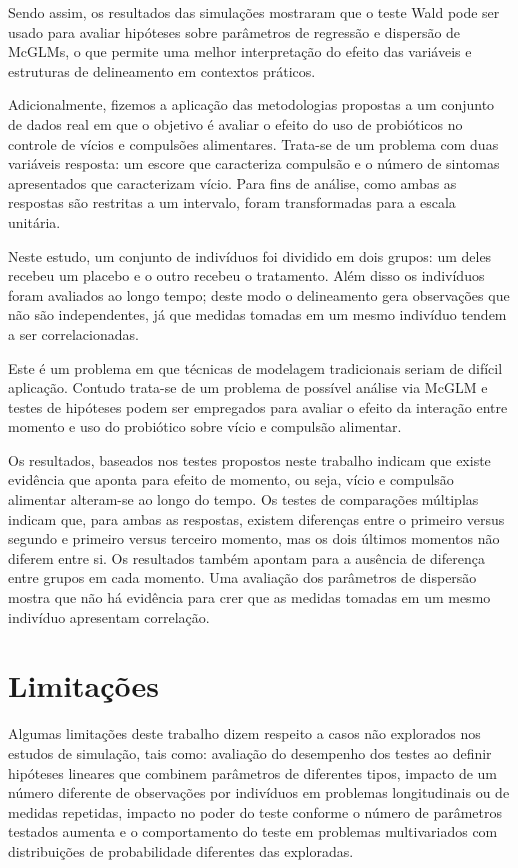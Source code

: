 Sendo assim, os resultados das simulações mostraram que o teste Wald pode ser usado para avaliar hipóteses sobre parâmetros de regressão e dispersão de McGLMs, o que permite uma melhor interpretação do efeito das variáveis e estruturas de delineamento em contextos práticos.

Adicionalmente, fizemos a aplicação das metodologias propostas a um conjunto de dados real em que o objetivo é avaliar o efeito do uso de probióticos no controle de vícios e compulsões alimentares. Trata-se de um problema com duas variáveis resposta: um escore que caracteriza compulsão e o número de sintomas apresentados que caracterizam vício. Para fins de análise, como ambas as respostas são restritas a um intervalo, foram transformadas para a escala unitária.

Neste estudo, um conjunto de indivíduos foi dividido em dois grupos: um deles recebeu um placebo e o outro recebeu o tratamento. Além disso os indivíduos foram avaliados ao longo tempo; deste modo o delineamento gera observações que não são independentes, já que medidas tomadas em um mesmo indivíduo tendem a ser correlacionadas. 

Este é um problema em que técnicas de modelagem tradicionais seriam de difícil aplicação. Contudo trata-se de um problema de possível análise via McGLM e testes de hipóteses podem ser empregados para avaliar o efeito da interação entre momento e uso do probiótico sobre vício e compulsão alimentar.

Os resultados, baseados nos testes propostos neste trabalho indicam que existe evidência que aponta para efeito de momento, ou seja, vício e compulsão alimentar alteram-se ao longo do tempo. Os testes de comparações múltiplas indicam que, para ambas as respostas, existem diferenças entre o primeiro versus segundo e primeiro versus terceiro momento, mas os dois últimos momentos não diferem entre si. Os resultados também apontam para a ausência de diferença entre grupos em cada momento. Uma avaliação dos parâmetros de dispersão mostra que não há evidência para crer que as medidas tomadas em um mesmo indivíduo apresentam correlação.


\section{Limitações}

Algumas limitações deste trabalho dizem respeito a casos não explorados nos estudos de simulação, tais como: avaliação do desempenho dos testes ao definir hipóteses lineares que combinem parâmetros de diferentes tipos, impacto de um número diferente de observações por indivíduos em problemas longitudinais ou de medidas repetidas, impacto no poder do teste conforme o número de parâmetros testados aumenta e o comportamento do teste em problemas multivariados com distribuições de probabilidade diferentes das exploradas.

